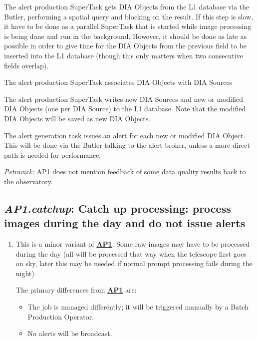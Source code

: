 \documentclass[DM,toc,lsstdraft]{lsstdoc}
\newcommand{\usecase}[3]{%
\subsection{\emph{#1}: #2}
\label{use:#1}
\begin{enumerate}[label=\alph*.]
#3
\end{enumerate}
}
\newcommand{\useref}[1]{\hyperref[use:#1]{\textcolor{lsstblue}{\textbf{#1}}}}
\begin{document}
{\item
The alert production SuperTask gets DIA Objects from the L1 database via the Butler, performing a spatial query and blocking on the result.
If this step is slow, it have to be done as a parallel SuperTask that is started while image processing is being done and run in the background.
However, it should be done as late as possible in order to give time for the DIA Objects from the previous field to be inserted into the L1 database (though this only matters when two consecutive fields overlap).

\item
The alert production SuperTask associates DIA Objects with DIA Sources

\item
The alert production SuperTask writes new DIA Sources and new or modified DIA Objects (one per DIA Source) to the L1 database.
Note that the modified DIA Objects will be saved as new DIA Objects.

\item
The alert generation task issues an alert for each new or modified DIA Object.
This will be done via the Butler talking to the alert broker, unless a more direct path is needed for performance.

}

\begin{draftnote}
\emph{Petravick:} AP1 does not mention feedback of some data quality results back to the observatory.
\end{draftnote}

\usecase{AP1.catchup}{Catch up processing: process images during the day and do not issue alerts}{%

\item
This is a minor variant of \useref{AP1}.
Some raw images may have to be processed during the day (all will be processed that way when the telescope first goes on sky, later this may be needed if normal prompt processing fails during the night)

The primary differences from \useref{AP1} are:
\begin{itemize}
\item The job is managed differently; it will be triggered manually by a Batch Production Operator.
\item No alerts will be broadcast.
\end{itemize}

}
\end{document}
